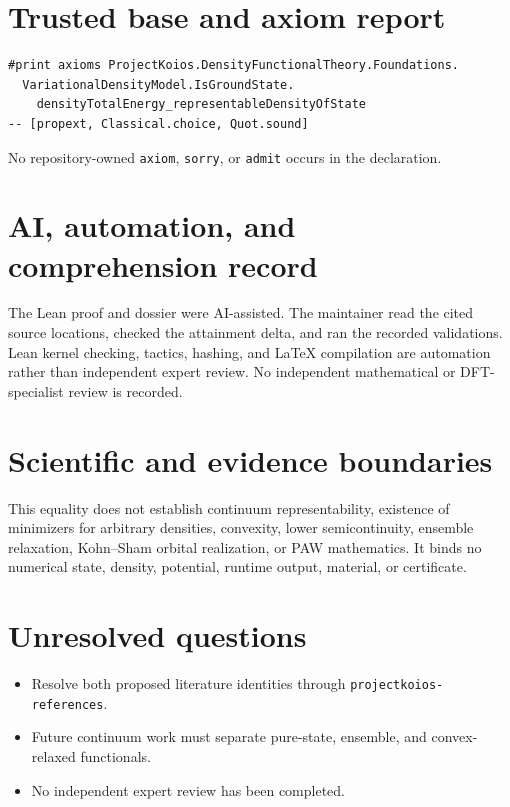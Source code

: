 \section{Trusted base and axiom report}
\begin{lstlisting}
#print axioms ProjectKoios.DensityFunctionalTheory.Foundations.
  VariationalDensityModel.IsGroundState.
    densityTotalEnergy_representableDensityOfState
-- [propext, Classical.choice, Quot.sound]
\end{lstlisting}
No repository-owned \texttt{axiom}, \texttt{sorry}, or \texttt{admit} occurs in the declaration.

\section{AI, automation, and comprehension record}
The Lean proof and dossier were AI-assisted.  The maintainer read the cited source locations,
checked the attainment delta, and ran the recorded validations.  Lean kernel checking, tactics,
hashing, and LaTeX compilation are automation rather than independent expert review.  No
independent mathematical or DFT-specialist review is recorded.

\section{Scientific and evidence boundaries}
This equality does not establish continuum representability, existence of minimizers for arbitrary
densities, convexity, lower semicontinuity, ensemble relaxation, Kohn--Sham orbital realization, or
PAW mathematics.  It binds no numerical state, density, potential, runtime output, material, or
certificate.

\section{Unresolved questions}
\begin{itemize}
\item Resolve both proposed literature identities through \texttt{projectkoios-references}.
\item Future continuum work must separate pure-state, ensemble, and convex-relaxed functionals.
\item No independent expert review has been completed.
\end{itemize}

